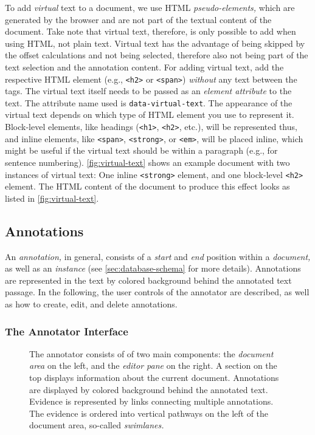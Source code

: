 To add \emph{virtual} text to a document, we use HTML \emph{pseudo-elements,} which are generated by the browser and are not part of the textual content of the document.
Take note that virtual text, therefore, is only possible to add when using HTML, not plain text.
Virtual text has the advantage of being skipped by the offset calculations and not being selected, therefore also not being part of the text selection and the annotation content.
For adding virtual text, add the respective HTML element (e.g., \verb!<h2>! or \verb!<span>!) \emph{without} any text between the tags.
The virtual text itself needs to be passed as an \emph{element attribute} to the text.
The attribute name used is \verb!data-virtual-text!.
The appearance of the virtual text depends on which type of HTML element you use to represent it.
Block-level elements, like headings (\verb!<h1>!, \verb!<h2>!, etc.), will be represented thus, and inline elements, like \verb!<span>!, \verb!<strong>!, or \verb!<em>!, will be placed inline, which might be useful if the virtual text should be within a paragraph (e.g., for sentence numbering).
\cref{fig:virtual-text} shows an example document with two instances of virtual text:
One inline \verb!<strong>! element, and one block-level \verb!<h2>! element.
The HTML content of the document to produce this effect looks as listed in \cref{fig:virtual-text}.


\subsection{Annotations}
\label{sec:annotations}

An \emph{annotation,} in general, consists of a \emph{start} and \emph{end} position within a \emph{document,} as well as an \emph{instance} (see \cref{sec:database-schema} for more details).
Annotations are represented in the text by colored background behind the annotated text passage.
In the following, the user controls of the annotator are described, as well as how to create, edit, and delete annotations.


\subsubsection{The Annotator Interface}
\label{sec:annotation-annotator}

\begin{figure}[htb]

  \caption{
    The annotator consists of of two main components:
    the \emph{document area} on the left, and the \emph{editor pane} on the right.
    A section on the top displays information about the current document.
    Annotations are displayed by colored background behind the annotated text.
    Evidence is represented by links connecting multiple annotations.
    The evidence is ordered into vertical pathways on the left of the document area, so-called \emph{swimlanes.}
  }
  \label{fig:annotator-interface}
\end{figure}

